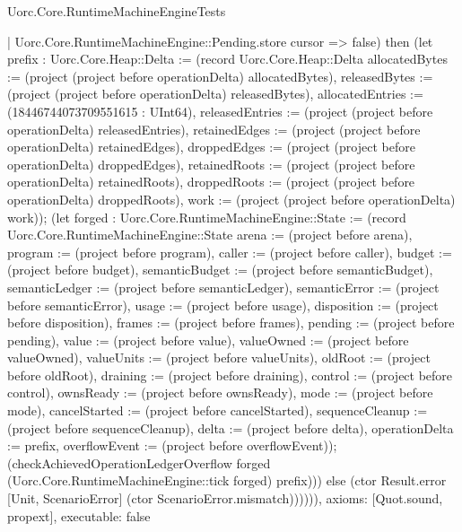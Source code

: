 \begin{lexlean}{Uorc.Core.RuntimeMachineEngineTests}
\begin{semanticmodule}
{          | Uorc.Core.RuntimeMachineEngine::Pending.store cursor => false) then (let prefix : Uorc.Core.Heap::Delta := (record Uorc.Core.Heap::Delta {allocatedBytes := (project (project before operationDelta) allocatedBytes), releasedBytes := (project (project before operationDelta) releasedBytes), allocatedEntries := (18446744073709551615 : UInt64), releasedEntries := (project (project before operationDelta) releasedEntries), retainedEdges := (project (project before operationDelta) retainedEdges), droppedEdges := (project (project before operationDelta) droppedEdges), retainedRoots := (project (project before operationDelta) retainedRoots), droppedRoots := (project (project before operationDelta) droppedRoots), work := (project (project before operationDelta) work)}); (let forged : Uorc.Core.RuntimeMachineEngine::State := (record Uorc.Core.RuntimeMachineEngine::State {arena := (project before arena), program := (project before program), caller := (project before caller), budget := (project before budget), semanticBudget := (project before semanticBudget), semanticLedger := (project before semanticLedger), semanticError := (project before semanticError), usage := (project before usage), disposition := (project before disposition), frames := (project before frames), pending := (project before pending), value := (project before value), valueOwned := (project before valueOwned), valueUnits := (project before valueUnits), oldRoot := (project before oldRoot), draining := (project before draining), control := (project before control), ownsReady := (project before ownsReady), mode := (project before mode), cancelStarted := (project before cancelStarted), sequenceCleanup := (project before sequenceCleanup), delta := (project before delta), operationDelta := prefix, overflowEvent := (project before overflowEvent)}); (checkAchievedOperationLedgerOverflow forged (Uorc.Core.RuntimeMachineEngine::tick forged) prefix))) else (ctor Result.error [Unit, ScenarioError] (ctor ScenarioError.mismatch)))))),
  axioms: [Quot.sound, propext],
  executable: false
}


\end{semanticmodule}
\end{lexlean}
